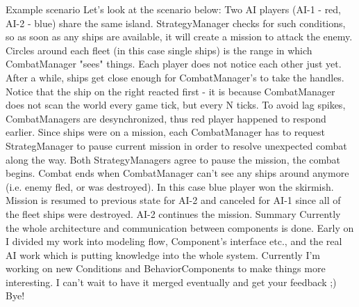 Example scenario
Let's look at the scenario below:
Two AI players (AI-1 - red, AI-2 - blue) share the same island. 
StrategyManager checks for such conditions, so as soon as any ships are available, it will create a mission to attack the enemy.
Circles around each fleet (in this case single ships) is the range in which CombatManager "sees" things. 
Each player does not notice each other just yet.
After a while, ships get close enough for CombatManager's to take the handles. 
Notice that the ship on the right reacted first - it is because CombatManager does not scan the world every game tick, but every N ticks. 
To avoid lag spikes, CombatManagers are desynchronized, thus red player happened to respond earlier.
Since ships were on a mission, each CombatManager has to request StrategManager to pause current mission in order to resolve unexpected combat along the way.
Both StrategyManagers agree to pause the mission, the combat begins.
Combat ends when CombatManager can't see any ships around anymore (i.e. enemy fled, or was destroyed). 
In this case blue player won the skirmish. 
Mission is resumed to previous state for AI-2 and canceled for AI-1 since all of the fleet ships were destroyed. 
AI-2 continues the mission.
Summary
Currently the whole architecture and communication between components is done. 
Early on I divided my work into modeling flow, Component's interface etc., and the real AI work which is putting knowledge into the whole system.
Currently I'm working on new Conditions and BehaviorComponents to make things more interesting.
I can't wait to have it merged eventually and get your feedback ;)
Bye!
